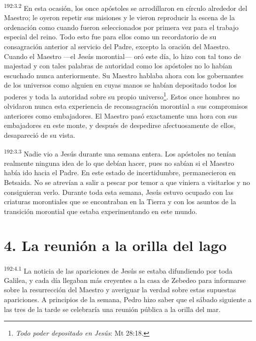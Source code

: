 \par 
\textsuperscript{192:3.2} En esta ocasión, los once apóstoles se arrodillaron en círculo alrededor del Maestro; le oyeron repetir sus misiones y le vieron reproducir la escena de la ordenación como cuando fueron seleccionados por primera vez para el trabajo especial del reino. Todo esto fue para ellos como un recordatorio de su consagración anterior al servicio del Padre, excepto la oración del Maestro. Cuando el Maestro ---el Jesús morontial--- oró este día, lo hizo con tal tono de majestad y con tales palabras de autoridad como los apóstoles no lo habían escuchado nunca anteriormente. Su Maestro hablaba ahora con los gobernantes de los universos como alguien en cuyas manos se habían depositado todos los poderes y toda la autoridad sobre su propio universo\footnote{\textit{Todo poder depositado en Jesús}: Mt 28:18.}. Estos once hombres no olvidaron nunca esta experiencia de reconsagración morontial a sus compromisos anteriores como embajadores. El Maestro pasó exactamente una hora con sus embajadores en este monte, y después de despedirse afectuosamente de ellos, desapareció de su vista.

\par 
\textsuperscript{192:3.3} Nadie vio a Jesús durante una semana entera. Los apóstoles no tenían realmente ninguna idea de lo que debían hacer, pues no sabían si el Maestro había ido hacia el Padre. En este estado de incertidumbre, permanecieron en Betsaida. No se atrevían a salir a pescar por temor a que viniera a visitarlos y no consiguieran verlo. Durante toda esta semana, Jesús estuvo ocupado con las criaturas morontiales que se encontraban en la Tierra y con los asuntos de la transición morontial que estaba experimentando en este mundo.

\section*{4. La reunión a la orilla del lago}
\par 
\textsuperscript{192:4.1} La noticia de las apariciones de Jesús se estaba difundiendo por toda Galilea, y cada día llegaban más creyentes a la casa de Zebedeo para informarse sobre la resurrección del Maestro y averiguar la verdad sobre estas supuestas apariciones. A principios de la semana, Pedro hizo saber que el sábado siguiente a las tres de la tarde se celebraría una reunión pública a la orilla del mar.

